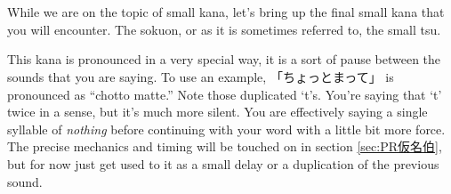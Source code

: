 \section[促音]{}\label{sec:PR仮名促音}

While we are on the topic of small kana, let's bring up the final small kana that you will encounter. The sokuon, or as it is sometimes referred to, the small tsu.

This kana is pronounced in a very special way, it is a sort of pause between the sounds that you are saying. To use an example, 「ちょっとまって」 is pronounced as ``chotto matte.'' Note those duplicated `t's. You're saying that `t' twice in a sense, but it's much more silent. You are effectively saying a single syllable of \textit{nothing} before continuing with your word with a little bit more force. The precise mechanics and timing will be touched on in section \ref{sec:PR仮名伯}, but for now just get used to it as a small delay or a duplication of the previous sound.